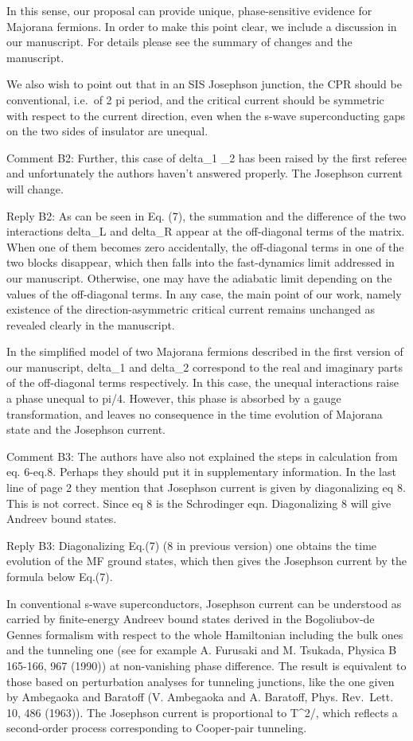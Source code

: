 \documentclass[11pt]{article}
\begin{document}
In this sense, our proposal can provide unique, phase-sensitive evidence
for Majorana fermions. In order to make this point clear, we include a
discussion in our manuscript. For details please see the summary of
changes and the manuscript.

We also wish to point out that in an SIS Josephson junction, the CPR
should be conventional, i.e.~of 2 pi period, and the critical current
should be symmetric with respect to the current direction, even when the
s-wave superconducting gaps on the two sides of insulator are unequal.

Comment B2: Further, this case of delta\_1 \neq \delta\_2 has been
raised by the first referee and unfortunately the authors haven't
answered properly. The Josephson current will change.

Reply B2: As can be seen in Eq. (7), the summation and the difference of
the two interactions delta\_L and delta\_R appear at the off-diagonal
terms of the matrix. When one of them becomes zero accidentally, the
off-diagonal terms in one of the two blocks disappear, which then falls
into the fast-dynamics limit addressed in our manuscript. Otherwise, one
may have the adiabatic limit depending on the values of the off-diagonal
terms. In any case, the main point of our work, namely existence of the
direction-asymmetric critical current remains unchanged as revealed
clearly in the manuscript.

In the simplified model of two Majorana fermions described in the first
version of our manuscript, delta\_1 and delta\_2 correspond to the real
and imaginary parts of the off-diagonal terms respectively. In this
case, the unequal interactions raise a phase unequal to pi/4. However,
this phase is absorbed by a gauge transformation, and leaves no
consequence in the time evolution of Majorana state and the Josephson
current.

Comment B3: The authors have also not explained the steps in calculation
from eq. 6-eq.8. Perhaps they should put it in supplementary
information. In the last line of page 2 they mention that Josephson
current is given by diagonalizing eq 8. This is not correct. Since eq 8
is the Schrodinger eqn. Diagonalizing 8 will give Andreev bound states.

Reply B3: Diagonalizing Eq.(7) (8 in previous version) one obtains the
time evolution of the MF ground states, which then gives the Josephson
current by the formula below Eq.(7).

In conventional s-wave superconductors, Josephson current can be
understood as carried by finite-energy Andreev bound states derived in
the Bogoliubov-de Gennes formalism with respect to the whole Hamiltonian
including the bulk ones and the tunneling one (see for example A.
Furusaki and M. Tsukada, Physica B 165-166, 967 (1990)) at non-vanishing
phase difference. The result is equivalent to those based on
perturbation analyses for tunneling junctions, like the one given by
Ambegaoka and Baratoff (V. Ambegaoka and A. Baratoff, Phys. Rev.~Lett.
10, 486 (1963)). The Josephson current is proportional to T\^{}2/\Delta,
which reflects a second-order process corresponding to Cooper-pair
tunneling.
\end{document}
